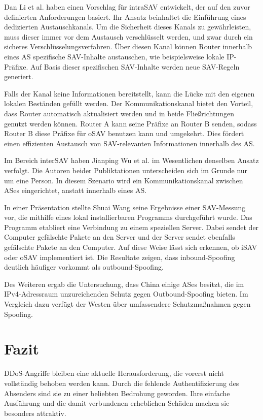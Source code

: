\documentclass[sigplan,screen]{acmart}
\begin{document}
Dan Li et al. \cite{intraSAVNET01} haben einen Vorschlag für intraSAV entwickelt, der auf den zuvor definierten Anforderungen basiert. Ihr Ansatz beinhaltet die Einführung eines dedizierten Austauschkanals. Um die Sicherheit dieses Kanals zu gewährleisten, muss dieser immer vor dem Austausch verschlüsselt werden, und zwar durch ein sicheres Verschlüsselungsverfahren. Über diesen Kanal können Router innerhalb eines AS spezifische SAV-Inhalte austauschen, wie beispielsweise lokale IP-Präfixe. Auf Basis dieser spezifischen SAV-Inhalte werden neue SAV-Regeln generiert.

Falls der Kanal keine Informationen bereitstellt, kann die Lücke mit den eigenen lokalen Beständen gefüllt werden. Der Kommunikationskanal bietet den Vorteil, dass Router automatisch aktualisiert werden und in beide Fließrichtungen genutzt werden können. Router A kann seine Präfixe an Router B senden, sodass Router B diese Präfixe für oSAV benutzen kann und umgekehrt. Dies fördert einen effizienten Austausch von SAV-relevanten Informationen innerhalb des AS.

Im Bereich interSAV haben Jianping Wu et al. \cite{interSAVNET01} im Wesentlichen denselben Ansatz verfolgt. Die Autoren beider Publiktationen unterscheiden sich im Grunde nur um eine Person. In diesem Szenario wird ein Kommunikationskanal zwischen ASes eingerichtet, anstatt innerhalb eines AS.

In einer Präsentation stellte Shuai Wang \cite{largemeasurment01} seine Ergebnisse einer SAV-Messung vor, die mithilfe eines lokal installierbaren Programms durchgeführt wurde. Das Programm etabliert eine Verbindung zu einem speziellen Server. Dabei sendet der Computer gefälschte Pakete an den Server und der Server sendet ebenfalls gefälschte Pakete an den Computer. Auf diese Weise lässt sich erkennen, ob iSAV oder oSAV implementiert ist. Die Resultate zeigen, dass inbound-Spoofing deutlich häufiger vorkommt als outbound-Spoofing.

Des Weiteren ergab die Untersuchung, dass China einige ASes besitzt, die im IPv4-Adressraum unzureichenden Schutz gegen Outbound-Spoofing bieten. Im Vergleich dazu verfügt der Westen über umfassendere Schutzmaßnahmen gegen Spoofing.

\section{Fazit}
DDoS-Angriffe bleiben eine aktuelle Herausforderung, die vorerst nicht vollständig behoben werden kann. Durch die fehlende Authentifizierung des Absenders sind sie zu einer beliebten Bedrohung geworden. Ihre einfache Ausführung und die damit verbundenen erheblichen Schäden machen sie besonders attraktiv.
\end{document}
